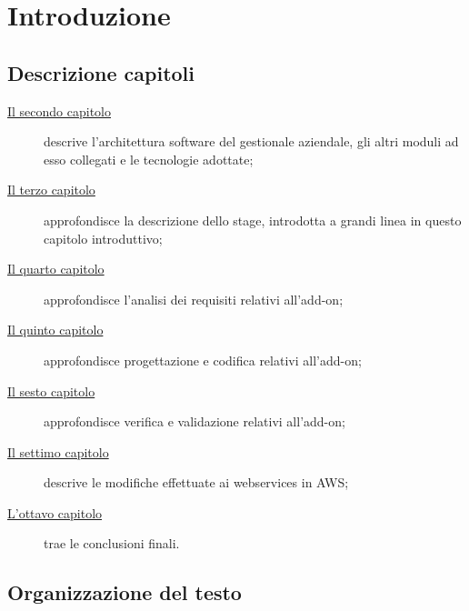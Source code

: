 
\chapter{Introduzione}
\label{cap:introduzione}

\section{Descrizione capitoli}
\begin{description}
	\item[{\hyperref[cap:descrizione-architettura]{Il secondo capitolo}}] descrive l'architettura software del gestionale aziendale, gli altri moduli ad esso collegati e le tecnologie adottate;
	
	\item[{\hyperref[cap:descrizione-stage]{Il terzo capitolo}}] approfondisce la descrizione dello stage, introdotta a grandi linea in questo capitolo introduttivo;
	
	\item[{\hyperref[cap:analisi-requisiti]{Il quarto capitolo}}] approfondisce l'analisi dei requisiti relativi all'add-on;
	
	\item[{\hyperref[cap:progettazione-codifica]{Il quinto capitolo}}] approfondisce progettazione e codifica relativi all'add-on;
	
	\item[{\hyperref[cap:verifica-validazione]{Il sesto capitolo}}] approfondisce verifica e validazione relativi all'add-on;
	
	\item[{\hyperref[cap:webservices]{Il settimo capitolo}}] descrive le modifiche effettuate ai webservices in AWS;
	\item[{\hyperref[cap:conclusioni]{L'ottavo capitolo}}] trae le conclusioni finali.
\end{description}
\section{Organizzazione del testo}

